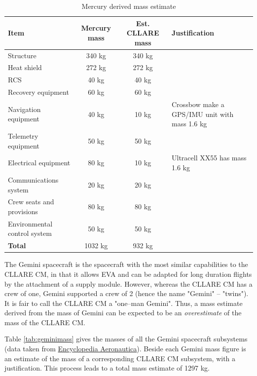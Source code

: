 \documentclass{report}
\begin{document}
\begin{table}
\centering
\begin{tabular}{|l|c|c|l|}
\hline
Item	& Mercury mass & Est. CLLARE mass & Justification \\
\hline \hline
Structure		& 340 kg	& 340 kg & \\
Heat shield		& 272 kg	& 272 kg & \\
RCS			& 40 kg		& 40 kg & \\
Recovery equipment	& 60 kg		& 60 kg & \\
Navigation equipment	& 40 kg		& 10 kg & Crossbow make a GPS/IMU unit with mass 1.6 kg \\
Telemetry equipment	& 50 kg		& 50 kg & \\
Electrical equipment	& 80 kg		& 10 kg & Ultracell XX55 has mass 1.6 kg \\
Communications system	& 20 kg		& 20 kg & \\
Crew seats and provisions & 80 kg	& 80 kg & \\
Environmental control system	& 50 kg		& 50 kg & \\
\hline \hline
\textbf{Total}	& 1032 kg & 932 kg	& \\
\hline
\end{tabular}
\caption{Mercury derived mass estimate}
\label{tab:mercurymass}
\end{table} 

The Gemini spacecraft is the spacecraft with the most similar capabilities to the CLLARE CM, in that it allows EVA and can be adapted for long duration flights by the attachment of a supply module.  However, whereas the CLLARE CM has a crew of one, Gemini supported a crew of 2 (hence the name "Gemini" -- "twins").  It is fair to call the CLLARE CM a "one--man Gemini".  Thus, a mass estimate derived from the mass of Gemini can be expected to be an \emph{overestimate} of the mass of the CLLARE CM.

Table \ref{tab:geminimass} gives the masses of all the Gemini spacecraft subsystems (data taken from \href{http://www.astronautix.com/craft/gemini.htm}{Encyclopedia Aeronautica}).  Beside each Gemini mass figure is an estimate of the mass of a corresponding CLLARE CM subsystem, with a justification.  This process leads to a total mass estimate of 1297 kg.
\end{document}
